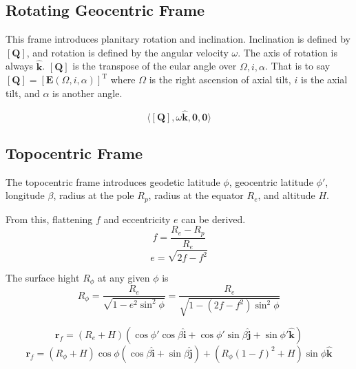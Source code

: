 \subsection{Rotating Geocentric Frame}
This frame introduces planitary rotation and inclination. Inclination is defined by $\left[\mathbf{Q}\right]$, and rotation
is defined by the angular velocity $\omega$. The axis of rotation is always $\hat{\mathbf{k}}$.
$\left[\mathbf{Q}\right]$ is the transpose of the eular angle over $\Omega,i,\alpha$.
That is to say $\left[\mathbf{Q}\right]=\left[\mathbf{E}\left(\Omega,i,\alpha\right)\right]^{\mathrm{T}}$ where $\Omega$ is
the right ascension of axial tilt, $i$ is the axial tilt, and $\alpha$ is another angle. %

\begin{equation}
    \label{rotating_geocentric_frame}
    \langle\left[\mathbf{Q}\right], \omega\hat{\mathbf{k}}, \mathbf{0}, \mathbf{0} \rangle
\end{equation}


\subsection{Topocentric Frame}
The topocentric frame introduces geodetic latitude $\phi$, geocentric latitude $\phi'$, longitude $\beta$, radius at the pole $R_p$,
radius at the equator $R_e$, and altitude $H$.

From this, flattening $f$ and eccentricity $e$ can be derived.
\begin{equation}
    \label{topocentric_flattening}
    f=\frac{R_e-R_p}{R_e}
\end{equation}
\begin{equation}
    \label{topocentric_ecc}
    e=\sqrt{2f-f^2}
\end{equation}


The surface hight $R_\phi$ at any given $\phi$ is
\begin{equation}
    \label{surface_height}
    R_\phi=\frac{R_e}{\sqrt{1-e^{2}\sin^{2}{\phi}}}=\frac{R_e}{\sqrt{1-\left(2f-f^2\right)\sin^2{\phi}}}
\end{equation}


\begin{equation}
    \label{topocentric_r_geocentric}
    \mathbf{r}_f=
    \left(R_{e}+H\right)\left(
        \cos{\phi'}\cos{\beta}\hat{\mathbf{i}} +
        \cos{\phi'}\sin{\beta}\hat{\mathbf{j}} +
        \sin{\phi'}\hat{\mathbf{k}}\right)
\end{equation}
\begin{equation}
    \label{topocentric_r_geodetic}
    \mathbf{r}_f=
    \left(R_\phi+H\right)\cos{\phi}\left(\cos{\beta}\hat{\mathbf{i}} + \sin{\beta}\hat{\mathbf{j}}\right) +
    \left(R_\phi\left(1-f\right)^{2}+H\right)\sin{\phi}\hat{\mathbf{k}}
\end{equation}

